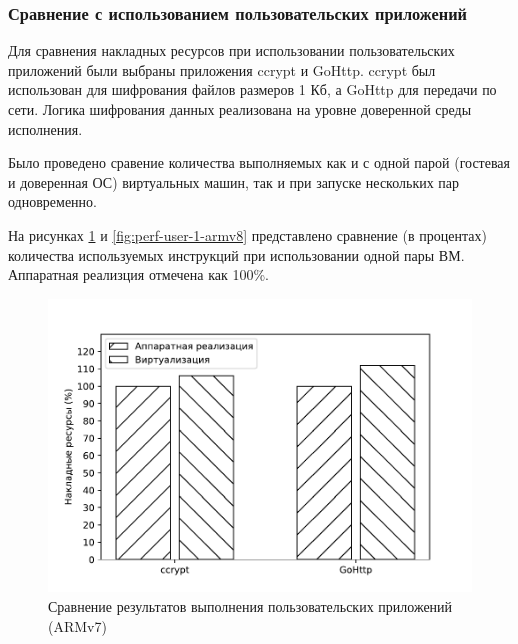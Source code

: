 \subsubsection{Сравнение с использованием пользовательских приложений}

Для сравнения накладных ресурсов при использовании пользовательских приложений были выбраны приложения ccrypt и GoHttp. ccrypt был использован для шифрования файлов размеров 1 Кб, а GoHttp для передачи по сети. Логика шифрования данных реализована на уровне доверенной среды исполнения. 

Было проведено сравение количества выполняемых как и с одной парой (гостевая и доверенная ОС) виртуальных машин, так и при запуске нескольких пар одновременно.

На рисунках \ref{fig:perf-user-1-armv7} и \ref{fig:perf-user-1-armv8} представлено сравнение (в процентах) количества используемых инструкций при использовании одной пары ВМ. Аппаратная реализция отмечена как 100\%.

\begin{figure}[h]
	\centering
	\includegraphics[width=\textwidth]{img/user-1-armv7.pdf}
	\caption{Сравнение результатов выполнения пользовательских приложений (ARMv7)}
	\label{fig:perf-user-1-armv7}
\end{figure}

